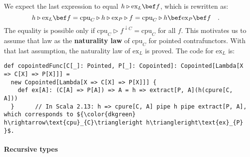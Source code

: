 We expect the last expression to equal $h\triangleright\text{ex}_{L}\bef f$,
which is rewritten as:
\[
h\triangleright\text{ex}_{L}\bef f=\text{cpu}_{C}\triangleright h\triangleright\text{ex}_{P}\triangleright f=\text{cpu}_{C}\triangleright h\bef\text{ex}_{P}\bef f\quad.
\]
The equality is possible only if $\text{cpu}_{C}\triangleright f^{\downarrow C}=\text{cpu}_{C}$
for all $f$. This motivates us to assume that law as the \textbf{naturality
law} of $\text{cpu}_{C}$ for pointed contrafunctors. With that last
assumption, the naturality law of $\text{ex}_{L}$ is proved. The
code for $\text{ex}_{L}$ is:
\begin{lstlisting}[mathescape=true]
def copointedFunc[C[_]: Pointed, P[_]: Copointed]: Copointed[Lambda[X => C[X] => P[X]]] =
  new Copointed[Lambda[X => C[X] => P[X]]] {
    def ex[A]: (C[A] => P[A]) => A = h => extract[P, A](h(cpure[C, A]))
  }      // In Scala 2.13: h => cpure[C, A] pipe h pipe extract[P, A], which corresponds to ${\color{dkgreen} h\rightarrow\text{cpu}_{C}\triangleright h\triangleright\text{ex}_{P} }$.
\end{lstlisting}


\paragraph{Recursive types}

